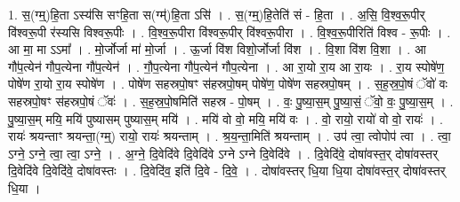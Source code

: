 \documentclass[17pt]{extarticle}
\begin{document}
1. स॒(ग्म्॒)हि॒ता ऽस्य॑सि सꣳहि॒ता स(ग्म्॑)हि॒ता ऽसि॑ । . स॒(ग्म्॒)हि॒तेति॑ सं - हि॒ता । . अ॒सि॒ वि॒श्व॒रू॒पीर् वि॑श्वरू॒पी र॑स्यसि विश्वरू॒पीः । . वि॒श्व॒रू॒पीरा वि॑श्वरू॒पीर् वि॑श्वरू॒पीरा । . वि॒श्व॒रू॒पीरिति॑ विश्व - रू॒पीः । . आ मा॒ मा ऽऽमा᳚ । . मो॒र्जोर्जा मा॑ मो॒र्जा । . ऊ॒र्जा वि॑श विशो॒र्जोर्जा वि॑श । . वि॒शा वि॑श वि॒शा । . आ गौ॑प॒त्येन॑ गौप॒त्येना गौ॑प॒त्येन॑ । . गौ॒प॒त्येना गौ॑प॒त्येन॑ गौप॒त्येना । . आ रा॒यो रा॒य आ रा॒यः । . रा॒य स्पोषे॑ण॒ पोषे॑ण रा॒यो रा॒य स्पोषे॑ण । . पोषे॑ण सहस्रपो॒षꣳ स॑हस्रपो॒षम् पोषे॑ण॒ पोषे॑ण सहस्रपो॒षम् । . स॒ह॒स्र॒पो॒षं ॅवो॑ वः सहस्रपो॒षꣳ स॑हस्रपो॒षं ॅवः॑ । . स॒ह॒स्र॒पो॒षमिति॑ सहस्र - पो॒षम् । . वः॒ पु॒ष्या॒स॒म् पु॒ष्या॒सं॒ ॅवो॒ वः॒ पु॒ष्या॒स॒म् । . पु॒ष्या॒स॒म् मयि॒ मयि॑ पुष्यासम् पुष्यास॒म् मयि॑ । . मयि॑ वो वो॒ मयि॒ मयि॑ वः । . वो॒ रायो॒ रायो॑ वो वो॒ रायः॑ । . रायः॑ श्रयन्ताꣳ श्रयन्ता॒(ग्म्॒) रायो॒ रायः॑ श्रयन्ताम् । . श्र॒य॒न्ता॒मिति॑ श्रयन्ताम् । . उप॑ त्वा॒ त्वोपोप॑ त्वा । . त्वा॒ ऽग्ने॒ ऽग्ने॒ त्वा॒ त्वा॒ ऽग्ने॒ । . अ॒ग्ने॒ दि॒वेदि॑वे दि॒वेदि॑वे ऽग्ने ऽग्ने दि॒वेदि॑वे । . दि॒वेदि॑वे॒ दोषा॑वस्त॒र् दोषा॑वस्तर् दि॒वेदि॑वे दि॒वेदि॑वे॒ दोषा॑वस्तः । . दि॒वेदि॑व॒ इति॑ दि॒वे - दि॒वे॒ । . दोषा॑वस्तर् धि॒या धि॒या दोषा॑वस्त॒र् दोषा॑वस्तर् धि॒या । \newline
\end{document}
